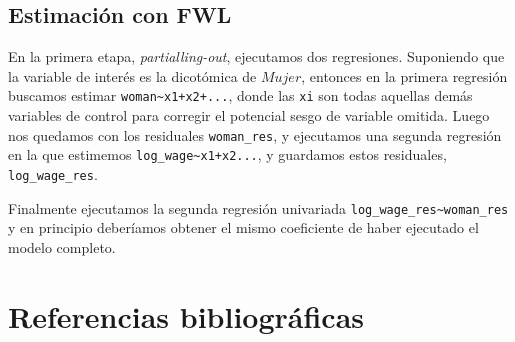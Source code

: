 \documentclass[
  11pt,
  letterpaper,
]{article}
\begin{document}
\hypertarget{estimaciuxf3n-con-fwl}{%
\subsection{Estimación con FWL}\label{estimaciuxf3n-con-fwl}}

En la primera etapa, \emph{partialling-out}, ejecutamos dos regresiones.
Suponiendo que la variable de interés es la dicotómica de \(Mujer\),
entonces en la primera regresión buscamos estimar
\texttt{woman\textasciitilde{}x1+x2+...}, donde las \texttt{xi} son
todas aquellas demás variables de control para corregir el potencial
sesgo de variable omitida. Luego nos quedamos con los residuales
\texttt{woman\_res}, y ejecutamos una segunda regresión en la que
estimemos \texttt{log\_wage\textasciitilde{}x1+x2...}, y guardamos estos
residuales, \texttt{log\_wage\_res}.

Finalmente ejecutamos la segunda regresión univariada
\texttt{log\_wage\_res\textasciitilde{}woman\_res} y en principio
deberíamos obtener el mismo coeficiente de haber ejecutado el modelo
completo.

\hypertarget{referencias-bibliogruxe1ficas}{%
\section{Referencias
bibliográficas}\label{referencias-bibliogruxe1ficas}}
\end{document}
